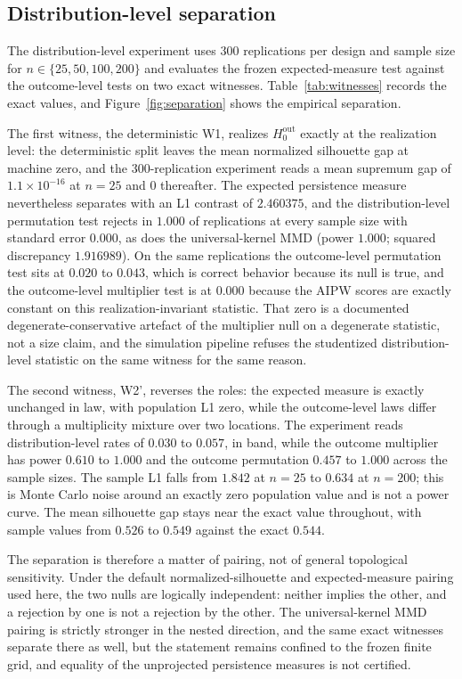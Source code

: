 \subsection{Distribution-level separation}
\label{sec:exp:separation}

The distribution-level experiment uses $300$ replications per design and sample size for $n \in \{25,50,100,200\}$ and evaluates the frozen expected-measure test against the outcome-level tests on two exact witnesses. Table~\ref{tab:witnesses} records the exact values, and Figure~\ref{fig:separation} shows the empirical separation.

The first witness, the deterministic W1, realizes $H_0^{\mathrm{out}}$ exactly at the realization level: the deterministic split leaves the mean normalized silhouette gap at machine zero, and the $300$-replication experiment reads a mean supremum gap of $1.1\times10^{-16}$ at $n=25$ and $0$ thereafter. The expected persistence measure nevertheless separates with an L1 contrast of $2.460375$, and the distribution-level permutation test rejects in $1.000$ of replications at every sample size with standard error $0.000$, as does the universal-kernel MMD (power $1.000$; squared discrepancy $1.916989$). On the same replications the outcome-level permutation test sits at $0.020$ to $0.043$, which is correct behavior because its null is true, and the outcome-level multiplier test is at $0.000$ because the AIPW scores are exactly constant on this realization-invariant statistic. That zero is a documented degenerate-conservative artefact of the multiplier null on a degenerate statistic, not a size claim, and the simulation pipeline refuses the studentized distribution-level statistic on the same witness for the same reason.

The second witness, W2', reverses the roles: the expected measure is exactly unchanged in law, with population L1 zero, while the outcome-level laws differ through a multiplicity mixture over two locations. The experiment reads distribution-level rates of $0.030$ to $0.057$, in band, while the outcome multiplier has power $0.610$ to $1.000$ and the outcome permutation $0.457$ to $1.000$ across the sample sizes. The sample L1 falls from $1.842$ at $n=25$ to $0.634$ at $n=200$; this is Monte Carlo noise around an exactly zero population value and is not a power curve. The mean silhouette gap stays near the exact value throughout, with sample values from $0.526$ to $0.549$ against the exact $0.544$.

The separation is therefore a matter of pairing, not of general topological sensitivity. Under the default normalized-silhouette and expected-measure pairing used here, the two nulls are logically independent: neither implies the other, and a rejection by one is not a rejection by the other. The universal-kernel MMD pairing is strictly stronger in the nested direction, and the same exact witnesses separate there as well, but the statement remains confined to the frozen finite grid, and equality of the unprojected persistence measures is not certified.

